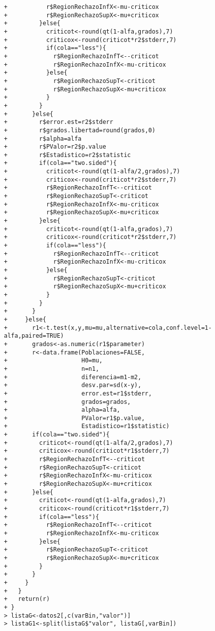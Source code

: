 \begin{solucion}
\begin{verbatim}
+           r$RegionRechazoInfX<-mu-criticox
+           r$RegionRechazoSupX<-mu+criticox
+         }else{
+           criticot<-round(qt(1-alfa,grados),7)
+           criticox<-round(criticot*r2$stderr,7)
+           if(cola=="less"){
+             r$RegionRechazoInfT<--criticot
+             r$RegionRechazoInfX<-mu-criticox
+           }else{
+             r$RegionRechazoSupT<-criticot
+             r$RegionRechazoSupX<-mu+criticox
+           }
+         }
+       }else{
+         r$error.est=r2$stderr
+         r$grados.libertad=round(grados,0)
+         r$alpha=alfa
+         r$PValor=r2$p.value
+         r$Estadistico=r2$statistic
+         if(cola=="two.sided"){
+           criticot<-round(qt(1-alfa/2,grados),7)
+           criticox<-round(criticot*r2$stderr,7)
+           r$RegionRechazoInfT<--criticot
+           r$RegionRechazoSupT<-criticot
+           r$RegionRechazoInfX<-mu-criticox
+           r$RegionRechazoSupX<-mu+criticox
+         }else{
+           criticot<-round(qt(1-alfa,grados),7)
+           criticox<-round(criticot*r2$stderr,7)
+           if(cola=="less"){
+             r$RegionRechazoInfT<--criticot
+             r$RegionRechazoInfX<-mu-criticox
+           }else{
+             r$RegionRechazoSupT<-criticot
+             r$RegionRechazoSupX<-mu+criticox
+           }
+         }
+       }
+     }else{
+       r1<-t.test(x,y,mu=mu,alternative=cola,conf.level=1-alfa,paired=TRUE)
+       grados<-as.numeric(r1$parameter)
+       r<-data.frame(Poblaciones=FALSE,
+                     H0=mu,
+                     n=n1,
+                     diferencia=m1-m2,
+                     desv.par=sd(x-y),
+                     error.est=r1$stderr,
+                     grados=grados,
+                     alpha=alfa,
+                     PValor=r1$p.value,
+                     Estadistico=r1$statistic)
+       if(cola=="two.sided"){
+         criticot<-round(qt(1-alfa/2,grados),7)
+         criticox<-round(criticot*r1$stderr,7)
+         r$RegionRechazoInfT<--criticot
+         r$RegionRechazoSupT<-criticot
+         r$RegionRechazoInfX<-mu-criticox
+         r$RegionRechazoSupX<-mu+criticox
+       }else{
+         criticot<-round(qt(1-alfa,grados),7)
+         criticox<-round(criticot*r1$stderr,7)
+         if(cola=="less"){
+           r$RegionRechazoInfT<--criticot
+           r$RegionRechazoInfX<-mu-criticox
+         }else{
+           r$RegionRechazoSupT<-criticot
+           r$RegionRechazoSupX<-mu+criticox
+         }
+       }
+     }
+   }
+   return(r)
+ }
> listaG<-datos2[,c(varBin,"valor")]
> listaG1<-split(listaG$"valor", listaG[,varBin])

\end{verbatim}
\end{solucion}
